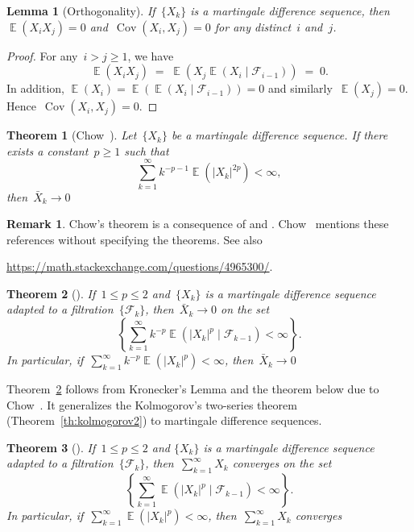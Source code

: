 \documentclass[12pt,a4paper]{article}  %
\newcounter{cite}
\newtheorem{theorem}{Theorem}[section]
\newtheorem{lemma}{Lemma}[section]
\theoremstyle{definition}
\newtheorem{remark}{Remark}[section]
\numberwithin{equation}{section}
\newcommand{\FF}{\mathcal{F}}
\newcommand{\as}{{\text{a.s.}}\xspace}
\DeclareMathOperator{\cov}{Cov}
\DeclareMathOperator{\expc}{\mathbb{E}}
\begin{document}
\begin{lemma}[Orthogonality]
    \label{lem:orth}
    If~$\{X_k\}$ is a martingale difference sequence, then
    $\expc(X_iX_j) = 0$ and~$\cov(X_i, X_j) = 0$ for any distinct~$i$ and~$j$.
\end{lemma}

\begin{proof}
    For any~$i > j \ge 1$, we have
    \[
        \expc(X_iX_j) \;=\;  \expc(X_j\expc(X_i\mathrel{|}\FF_{i-1})) \;=\; 0.
    \]
    In addition, $\expc(X_i) = \expc(\expc(X_i\mathrel{|}\FF_{i-1})) = 0$ and
    similarly~$\expc(X_j) = 0$. Hence~$\cov(X_i, X_j) = 0$.
\end{proof}

\begin{theorem}[Chow~\cite{Chow_1967}]
    \label{th:sllnmd1}
    Let~$\{X_k\}$ be a martingale difference sequence. If there exists a constant~$p\ge 1$ such that
   \[
       \sum_{k=1}^\infty k^{-p-1} \expc(|X_k|^{2p}) < \infty,
   \]
   then~$\bar{X}_k \to 0$ \as
\end{theorem}

\begin{remark}
    \label{rem:chow}
    Chow's theorem is a consequence of \cite[Theorem~2]{Chow_1960} and
    \cite[Theorem~9]{Burkholder_1966}. Chow~\cite{Chow_1967} mentions these references without
    specifying the theorems. See also
    \begin{center}
    \url{https://math.stackexchange.com/questions/4965300/}.
    \end{center}
\end{remark}

\begin{theorem}[\mbox{\cite[Theorem~2.18]{Hall_Heyde_1980}}]
    \label{th:sllnmd2}
    If~$1\le p\le 2$ and~$\{X_k\}$ is a martingale difference sequence adapted to a filtration~$\{\FF_k\}$,
    then~$\bar{X}_k \to 0$ \as on the set
   \[
       \left\{ \sum_{k=1}^\infty k^{-p} \expc(|X_k|^p
       \mathrel{|} \FF_{k-1}) < \infty \right\}.
   \]
   In particular, if~$\sum_{k=1}^\infty k^{-p} \expc(|X_k|^p) < \infty$, then~$\bar{X}_k \to 0$ \as
\end{theorem}

Theorem~\ref{th:sllnmd2} follows from Kronecker's Lemma and the theorem below due to
Chow~\cite{Chow_1965}. It generalizes the Kolmogorov's two-series theorem
(Theorem~\ref{th:kolmogorov2}) to martingale difference sequences.

\begin{theorem}[\mbox{\cite[Corollary~5]{Chow_1965}}]
    \label{th:kolmogorov2c}
    If~$1\le p\le 2$ and $\{X_k\}$ is a martingale difference sequence adapted to a filtration~$\{\FF_k\}$,
    then~$\sum_{k=1}^\infty X_k$ converges \as on the set
    \[
    \left\{\sum_{k=1}^\infty \expc(|X_k|^p\mathrel{|}\FF_{k-1}) < \infty\right\}.
    \]
    In particular, if~$\sum_{k=1}^\infty \expc(|X_k|^p) < \infty$, then~$\sum_{k=1}^\infty X_k$
    converges \as
\end{theorem}
\end{document}

